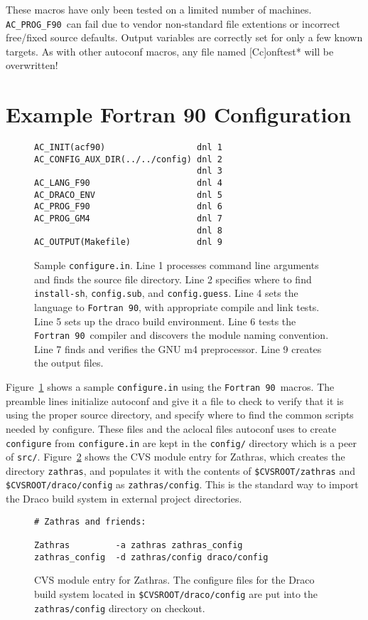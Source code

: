 \documentclass[11pt]{nmemo}
\newcommand{\fninety}{\texttt{Fortran~90}}
\newcommand{\progfninety}{\texttt{AC\_PROG\_F90}}
\begin{document}
These macros have only been tested on a limited number of machines.
\progfninety\ can fail due to vendor non-standard file extentions or
incorrect free/fixed source defaults.  Output variables are correctly
set for only a few known targets.  As with other autoconf macros, any
file named [Cc]onftest* will be overwritten!

\section{Example Fortran 90 Configuration}

\begin{figure}[hbt]
\begin{verbatim}
AC_INIT(acf90)                  dnl 1
AC_CONFIG_AUX_DIR(../../config) dnl 2
                                dnl 3
AC_LANG_F90                     dnl 4
AC_DRACO_ENV                    dnl 5
AC_PROG_F90                     dnl 6
AC_PROG_GM4                     dnl 7
                                dnl 8
AC_OUTPUT(Makefile)             dnl 9
\end{verbatim}
\caption{Sample \texttt{configure.in}. Line 1 processes command line
arguments and finds the source file directory.  Line 2 specifies where
to find \texttt{install-sh}, \texttt{config.sub}, and
\texttt{config.guess}.  Line 4 sets the language to \fninety, with
appropriate compile and link tests.  Line 5 sets up the draco build
environment.  Line 6 tests the \fninety\ compiler and discovers the
module naming convention.  Line 7 finds and verifies the GNU m4
preprocessor.  Line 9 creates the output files.}\label{fig:configure}
\end{figure}

Figure~\ref{fig:configure} shows a sample \texttt{configure.in} using
the \fninety\ macros.  The preamble lines initialize autoconf and give
it a file to check to verify that it is using the proper source
directory, and specify where to find the common scripts needed by
configure.  These files and the aclocal files autoconf uses to create
\texttt{configure} from \texttt{configure.in} are kept in the
\texttt{config/} directory which is a peer of \texttt{src/}.
Figure~\ref{fig:zathras} shows the CVS module entry for Zathras, which
creates the directory \texttt{zathras}, and populates it with the
contents of \texttt{\$CVSROOT/zathras} and
\texttt{\$CVSROOT/draco/config} as \texttt{zathras/config}.  This is
the standard way to import the Draco build system in external project
directories.
\begin{figure}[hbt]
\begin{verbatim}
# Zathras and friends:

Zathras         -a zathras zathras_config
zathras_config  -d zathras/config draco/config
\end{verbatim}
\caption{CVS module entry for Zathras.  The configure files for the
Draco build system located in \texttt{\$CVSROOT/draco/config} are put
into the \texttt{zathras/config} directory on
checkout.}\label{fig:zathras}
\end{figure}
\end{document}
